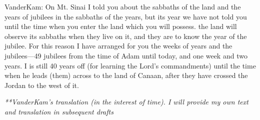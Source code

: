 
\begin{ethiopictext}
\end{ethiopictext}

\begin{transliteration}
\end{transliteration}

\begin{translation}
    VanderKam: On Mt. Sinai I told you about the sabbaths of the land and the years of jubilees in the sabbaths of the years, but its year we have not told you until the time when you enter the land which you will possess.
    the land will observe its sabbaths when they live on it, and they are to know the year of the jubilee.
    For this reason I have arranged for you the weeks of years and the jubilees---49 jubilees from the time of Adam until today, and one week and two years. I is still 40 years off (for learning the Lord's commandments) until the time when he leads (them) across to the land of Canaan, after they have crossed the Jordan to the west of it.

    \emph{**VanderKam's translation (in the interest of time). I will provide my own text and translation in subsequent drafts}
\end{translation}